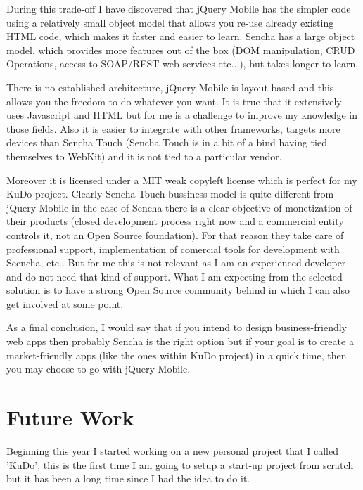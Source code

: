 \documentclass[a4paper,12pt]{book}
\begin{document}
During this trade-off I have discovered that jQuery Mobile has the simpler code using a relatively small object model that allows you re-use already existing HTML code, which makes it faster and easier to learn. Sencha has a large object model, which provides more features out of the box (DOM manipulation, CRUD Operations, access to SOAP/REST web services etc...), but takes longer to learn.

There is no established architecture, jQuery Mobile is layout-based and this allows you the freedom to do whatever you want. It is true that it extensively uses Javascript and HTML but for me is a challenge to improve my knowledge in those fields. Also it is easier to integrate with other frameworks, targets more devices than Sencha Touch (Sencha Touch is in a bit of a bind having tied themselves to WebKit) and it is not tied to a particular vendor.

Moreover it is licensed under a MIT weak copyleft license which is perfect for my KuDo project. Clearly Sencha Touch bussiness model is quite different from jQuery Mobile in the case of Sencha there is a clear objective of monetization of their products (closed development process right now and a commercial entity controls it, not an Open Source foundation). For that reason they take care of professional support, implementation of comercial tools for development with Secncha, etc.. But for me this is not relevant as I am an experienced developer and do not need that kind of support. What I am expecting from the selected solution is to have a strong Open Source community behind in which I can also get involved at some point.

As a final conclusion, I would say that if you intend to design business-friendly web apps then probably Sencha is the right option but if your goal is to create a market-friendly apps (like the ones within KuDo project) in a quick time, then you may choose to go with jQuery Mobile.


\chapter{Future Work}
\label{chap:future}

Beginning this year I started working on a new personal project that I called 'KuDo', this is the first time I am going to setup a start-up project from scratch but it has been a long time since I had the idea to do it. 
\end{document}
